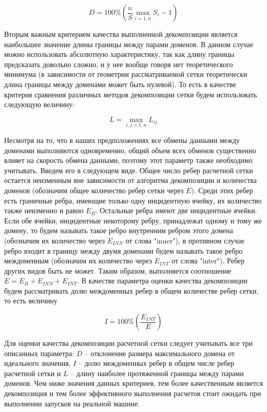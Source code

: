 \documentclass[
11pt,%
tightenlines,%
twoside,%
onecolumn,%
nofloats,%
nobibnotes,%
nofootinbib,%
superscriptaddress,%
noshowpacs,%
centertags]%
{revtex4}
\begin{document}
\begin{equation}
D = 100 \% \left( \frac{n}{S} \max_{i=1,n}{S_i} - 1 \right)
\end{equation}

Вторым важным критерием качества выполненной декомпозиции является наибольшее значение длины границы между парами доменов.
В данном случае можно использовать абсолютную характеристику, так как длину границы предсказать довольно сложно, и у нее вообще говоря нет теоретического минимума (в зависимости от геометрии рассматриваемой сетки теоретически длина границы между доменами может быть нулевой).
То есть в качестве критерия сравнения различных методов декомпозиции сетки будем использовать следующую величину:

\begin{equation}
L = \max_{i,j=1,n}{L_{ij}}
\end{equation}

Несмотря на то, что в наших предположениях все обмены данными между доменами выполняются одновременно, общий объем всех обменов существенно влияет на скорость обмена данными, поэтому этот параметр также необходимо учитывать.
Введем его в следующем виде.
Общее число ребер расчетной сетки остается неизменным вне зависимости от алгоритма декомпозиции и количества доменов (обозначим общее количество ребер сетки через $E$).
Среди этих ребер есть граничные ребра, имеющие только одну инцидентную ячейку, их количество также неизменно и равно $E_B$.
Остальные ребра имеют две инцидентные ячейки.
Если обе ячейки, инцидентные некоторому ребру, принадлежат одному и тому же домену, то будем называть такое ребро внутренним ребром этого домена (обозначим их количество через $E_{INN}$ от слова "inner"), в противном случае ребро входит в границу между двумя доменами будем называть такое ребро междоменным (обозначим их количество через $E_{INT}$ от слова "inter").
Ребер других видов быть не может.
Таким образом, выполняется соотношение $E = E_B + E_{INN} + E_{INT}$.
В качестве параметра оценки качества декомпозиции будем рассматривать долю междоменных ребер в общем количестве ребер сетки, то есть величину

\begin{equation}
I = 100 \% \left( \frac{E_{INT}}{E} \right)
\end{equation}
	  
Для оценки качества декомпозиции расчетной сетки следует учитывать все три описанных параметра: $D$ -- отклонение размера максимального домена от идеального значения, $I$ -- долю междоменных ребер в общем числе ребер расчетной сетки и $L$ -- длину наиболее протяженной границы между парами доменов.
Чем ниже значения данных критериев, тем более качественным является декомпозиция и тем более эффективного выполнения расчетов стоит ожидать при выполнении запусков на реальной машине.
\end{document}
